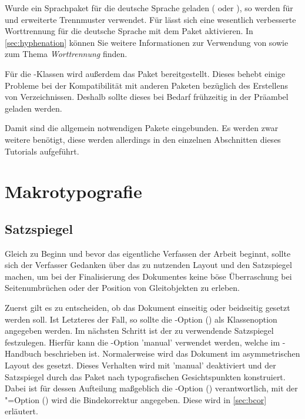 \documentclass[%
  english,ngerman,%
  cdgeometry=no,DIV=12,automark%
]{tudscrartcl}
\begin{document}
Wurde ein Sprachpaket für die deutsche Sprache geladen ( oder 
), so werden für  und  
erweiterte Trennmuster verwendet. Für  lässt sich eine 
wesentlich verbesserte Worttrennung für die deutsche Sprache mit dem Paket 
 aktivieren. In \autoref{sec:hyphenation} können Sie weitere 
Informationen zur Verwendung von  sowie zum Thema 
\emph{Worttrennung} finden.
%
\begin{Preamble}
\ifpdftex{
  \usepackage[T1]{fontenc}
  \usepackage[ngerman=ngerman-x-latest]{hyphsubst}
}{
  \usepackage{fontspec}
}
\end{Preamble}
%
Für die \KOMAScript-Klassen wird außerdem das Paket  
bereitgestellt. Dieses behebt einige Probleme bei der Kompatibilität mit 
anderen Paketen bezüglich des Erstellens von Verzeichnissen. Deshalb sollte 
dieses bei Bedarf frühzeitig in der Präambel geladen werden. 
%
\begin{Preamble}
\usepackage{scrhack}
\end{Preamble}
%
Damit sind die allgemein notwendigen Pakete eingebunden. Es werden zwar weitere 
benötigt, diese werden allerdings in den einzelnen Abschnitten dieses Tutorials 
aufgeführt.



\section{Makrotypografie}
\subsection{Satzspiegel}
Gleich zu Beginn und bevor das eigentliche Verfassen der Arbeit beginnt, sollte 
sich der Verfasser Gedanken über das zu nutzenden Layout und den Satzspiegel 
machen, um bei der Finalisierung des Dokumentes keine böse Überraschung bei 
Seitenumbrüchen oder der Position von Gleitobjekten zu erleben.

Zuerst gilt es zu entscheiden, ob das Dokument einseitig oder beidseitig 
gesetzt werden soll. Ist Letzteres der Fall, so sollte die \KOMAScript-Option 
() als Klassenoption angegeben werden. Im 
nächsten Schritt ist der zu verwendende Satzspiegel festzulegen. Hierfür kann 
die \TUDScript-Option 'manual' verwendet werden, welche im 
\TUDScript-Handbuch beschrieben ist. Normalerweise wird das Dokument im 
asymmetrischen Layout des \CDs gesetzt.
%
Dieses Verhalten wird mit 'manual' deaktiviert und 
der Satzspiegel durch das Paket  nach typografischen 
Gesichtspunkten konstruiert. Dabei ist für dessen Aufteilung maßgeblich die 
\KOMAScript-Option () verantwortlich, mit der 
\KOMAScript"=Option () wird die Bindekorrektur 
angegeben. Diese wird in \autoref{sec:bcor} erläutert.
\end{document}
